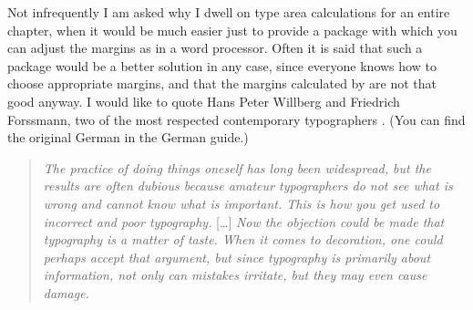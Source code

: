 Not infrequently I am asked why I dwell on type area
calculations for an entire chapter, when it would be much easier just to
provide a package with which you can adjust the margins as in a word
processor. Often it is said that such a package would be a better solution in
any case, since everyone knows how to choose appropriate margins, and that the
margins calculated by {\KOMAScript} are not that good anyway. I would like to
quote Hans Peter Willberg and Friedrich Forssmann, two of the most respected
contemporary typographers \cite{TYPO:ErsteHilfe}. (You can find the original
German in the German guide.)
\begin{quote}
  \textit{The practice of doing things oneself has long been
    widespread, but the results are often dubious because amateur typographers
    do not see what is wrong and cannot know what is important. This is how
    you get used to incorrect and poor typography.} [\dots] \textit{Now the
    objection could be made that typography is a matter of taste. When it
    comes to decoration, one could perhaps accept that argument, but since
    typography is primarily about information, not only can mistakes irritate,
    but they may even cause damage.}
\end{quote}
%
\EndIndexGroup

